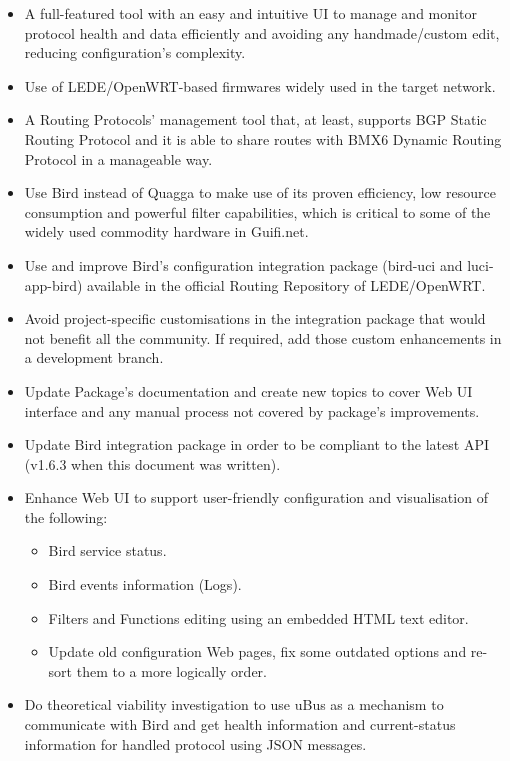 \begin{itemize}
    \item A full-featured tool with an easy and intuitive UI to manage and monitor protocol health and data efficiently and avoiding any handmade/custom edit, reducing configuration's complexity.
    \item Use of LEDE/OpenWRT-based firmwares widely used in the target network.
    \item A Routing Protocols' management tool that, at least, supports BGP Static Routing Protocol and it is able to share routes with BMX6 Dynamic Routing Protocol in a manageable way.
    \item Use Bird instead of Quagga to make use of its proven efficiency, low resource consumption and powerful filter capabilities, which is critical to some of the widely used commodity hardware in Guifi.net.
    \item Use and improve Bird's configuration integration package (bird-uci and luci-app-bird) available in the official Routing Repository of LEDE/OpenWRT.
    \item Avoid project-specific customisations in the integration package that would not benefit all the community. If required, add those custom enhancements in a development branch.
    \item Update Package's documentation and create new topics to cover Web UI interface and any manual process not covered by package's improvements.
    \item Update Bird integration package in order to be compliant to the latest API (v1.6.3 when this document was written).
    \item Enhance Web UI to support user-friendly configuration and visualisation of the following:
    \begin{itemize}
        \item Bird service status.
        \item Bird events information (Logs).
        \item Filters and Functions editing using an embedded HTML text editor.
        \item Update old configuration Web pages, fix some outdated options and re-sort them to a more logically order.
    \end{itemize}
    \item Do theoretical viability investigation to use uBus as a mechanism to communicate with Bird and get health information and current-status information for handled protocol using JSON messages.
\end{itemize}


